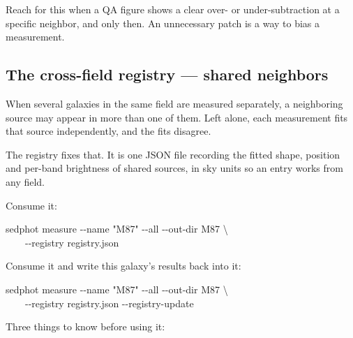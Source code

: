 \documentclass[11pt]{article}
\begin{document}
Reach for this when a QA figure shows a clear over- or under-subtraction
at a specific neighbor, and only then. An unnecessary patch is a way to
bias a measurement.

\subsection{The cross-field registry --- shared neighbors}
\label{sec:registry}

When several galaxies in the same field are measured separately, a
neighboring source may appear in more than one of them. Left alone, each
measurement fits that source independently, and the fits disagree.

The registry fixes that. It is one JSON file recording the fitted shape,
position and per-band brightness of shared sources, in sky units so an
entry works from any field.

Consume it:

\begin{cmd}\ttfamily\frenchspacing
sedphot measure -{}-name "M87" -{}-all -{}-out-dir M87 \textbackslash\\
\mbox{}~~~~-{}-registry registry.json
\end{cmd}

Consume it and write this galaxy's results back into it:

\begin{cmd}\ttfamily\frenchspacing
sedphot measure -{}-name "M87" -{}-all -{}-out-dir M87 \textbackslash\\
\mbox{}~~~~-{}-registry registry.json -{}-registry-update
\end{cmd}

Three things to know before using it:
\end{document}
